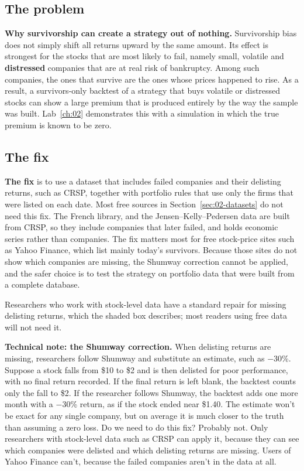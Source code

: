 \subsection{The problem}

\textbf{Why survivorship can create a strategy out of nothing.} Survivorship bias does not simply shift all returns upward by the same amount. Its effect is strongest for the stocks that are most likely to fail, namely small, volatile and \textbf{distressed} companies that are at real risk of bankruptcy. Among such companies, the ones that survive are the ones whose prices happened to rise. As a result, a survivors-only backtest of a strategy that buys volatile or distressed stocks can show a large premium that is produced entirely by the way the sample was built. Lab~\ref{ch:02} demonstrates this with a simulation in which the true premium is known to be zero.

\subsection{The fix}

\textbf{The fix} is to use a dataset that includes failed companies and their delisting returns, such as CRSP, together with portfolio rules that use only the firms that were listed on each date. 
Most free sources in Section~\ref{sec:02-datasets} do not need this fix. The French library,  and the Jensen--Kelly--Pedersen data are built from CRSP, so they include companies that later failed, and  holds economic series rather than companies. The fix matters most for free stock-price sites such as Yahoo Finance, which list mainly today's survivors. Because those sites do not show which companies are missing, the Shumway correction cannot be applied, and the safer choice is to test the strategy on portfolio data that were built from a complete database.

Researchers who work with stock-level data have a standard repair for missing delisting returns, which the shaded box describes; most readers using free data will not need it.

\begin{technote}
\textbf{Technical note: the Shumway correction.} When delisting returns are missing, researchers follow Shumway and substitute an estimate, such as $-30$\%.
Suppose a stock falls from \$10 to \$2 and is then delisted for poor performance, with no final return recorded.
If the final return is left blank, the backtest counts only the fall to \$2.
If the researcher follows Shumway, the backtest adds one more month with a $-30$\% return, as if the stock ended near \$1.40.
The estimate won’t be exact for any single company, but on average it is much closer to the truth than assuming a zero loss.
Do we need to do this fix? Probably not. Only researchers with stock-level data such as CRSP can apply it, because they can see which companies were delisted and which delisting returns are missing. Users of Yahoo Finance can’t, because the failed companies aren’t in the data at all.
\end{technote}


